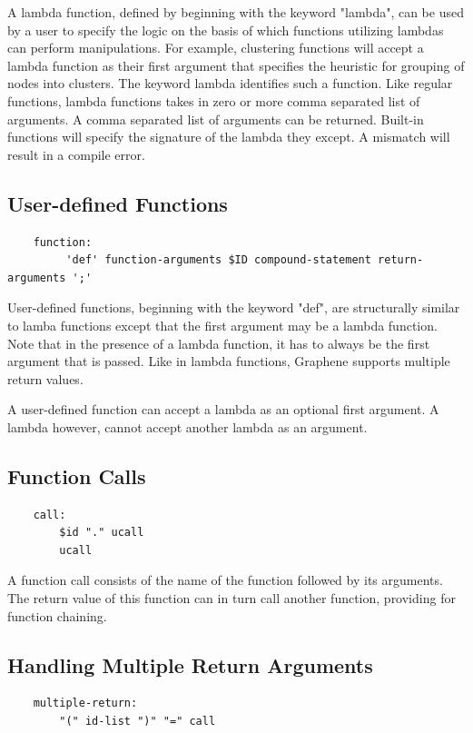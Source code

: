\documentclass[a4paper]{article}
\begin{document}
\begin{large}
\indent A lambda function, defined by beginning with the keyword "lambda", can be used by a user to specify the logic on the basis of which functions utilizing lambdas can perform manipulations. For example, clustering functions will accept a lambda function as their first argument that specifies the heuristic for grouping of nodes into clusters. The keyword lambda identifies such a function. Like regular functions, lambda functions takes in zero or more comma separated list of arguments. A comma separated list of arguments can be returned.
Built-in functions will specify the signature of the lambda they except. A mismatch will result in a compile error.

\subsection{User-defined Functions}
\begin{verbatim}
    function:
         'def' function-arguments $ID compound-statement return-arguments ';'
\end{verbatim}

\indent User-defined functions, beginning with the keyword "def", are structurally similar to lamba functions except that the first argument may be a lambda function. Note that in the presence of a lambda function, it has to always be the first argument that is passed. Like in lambda functions, Graphene supports multiple return values.

\indent A user-defined function can accept a lambda as an optional first argument. A lambda however, cannot accept another lambda as an argument.

\subsection{Function Calls}
\begin{verbatim}
    call:
        $id "." ucall
        ucall
\end{verbatim}

\indent A function call consists of the name of the function followed by its arguments. The return value of this function can in turn call another function, providing for function chaining.

\subsection{Handling Multiple Return Arguments}
\begin{verbatim}
    multiple-return:
        "(" id-list ")" "=" call
\end{verbatim}


\end{large}
\end{document}
